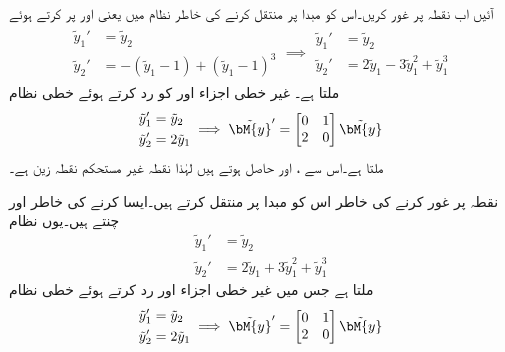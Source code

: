 آئیں اب نقطہ  پر غور کریں۔اس کو مبدا پر منتقل کرنے کی خاطر نظام  میں  یعنی  اور  پر کرتے ہوئے
\begin{gather*}
\begin{aligned}
\tilde{y}_1'&=\tilde{y}_2\\
\tilde{y}_2'&=-(\tilde{y}_1-1)+(\tilde{y}_1-1)^3
\end{aligned}\implies
\begin{aligned}
\tilde{y}_1'&=\tilde{y}_2\\
\tilde{y}_2'&=2\tilde{y}_1-3\tilde{y}_1^2+\tilde{y}_1^3
\end{aligned}
\end{gather*}
ملتا ہے۔ غیر خطی اجزاء  اور  کو رد کرتے ہوئے خطی نظام
\begin{gather*}
\begin{aligned}
\tilde{y}_1'&=\tilde{y}_2\\
\tilde{y}_2'&=2\tilde{y}_1
\end{aligned}\implies 
\begin{aligned}
\tilde{\bM{y}}'=\begin{bmatrix}0&1\\2&0  \end{bmatrix}\tilde{\bM{y}}
\end{aligned}
\end{gather*}
ملتا ہے۔اس سے ،  اور  حاصل ہوتے ہیں لہٰذا نقطہ  غیر مستحکم نقطہ زین ہے۔

نقطہ  پر غور کرنے کی  خاطر اس کو مبدا پر منتقل کرتے ہیں۔ایسا کرنے کی خاطر  اور  چنتے ہیں۔یوں نظام
\begin{align*}
\tilde{y}_1'&=\tilde{y}_2\\
\tilde{y}_2'&=2\tilde{y}_1+3\tilde{y}_1^2+\tilde{y}_1^3
\end{align*}
ملتا ہے جس میں غیر خطی اجزاء   اور  رد کرتے ہوئے  خطی نظام
\begin{gather*}
\begin{aligned}
\tilde{y}_1'&=\tilde{y}_2\\
\tilde{y}_2'&=2\tilde{y}_1
\end{aligned}\implies 
\begin{aligned}
\tilde{\bM{y}}'=\begin{bmatrix}0&1\\2&0  \end{bmatrix}\tilde{\bM{y}}
\end{aligned}
\end{gather*}

